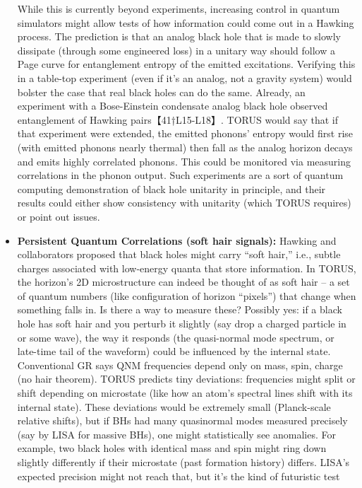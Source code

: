 \documentclass[]{article}
\begin{document}
\begin{itemize}
  While this is currently beyond experiments, increasing control in
  quantum simulators might allow tests of how information could come out
  in a Hawking process. The prediction is that an analog black hole that
  is made to slowly dissipate (through some engineered loss) in a
  unitary way should follow a Page curve for entanglement entropy of the
  emitted excitations. Verifying this in a table-top experiment (even if
  it's an analog, not a gravity system) would bolster the case that real
  black holes can do the same. Already, an experiment with a
  Bose-Einstein condensate analog black hole observed entanglement of
  Hawking pairs【41†L15-L18】. TORUS would say that if that experiment
  were extended, the emitted phonons' entropy would first rise (with
  emitted phonons nearly thermal) then fall as the analog horizon decays
  and emits highly correlated phonons. This could be monitored via
  measuring correlations in the phonon output. Such experiments are a
  sort of quantum computing demonstration of black hole unitarity in
  principle, and their results could either show consistency with
  unitarity (which TORUS requires) or point out issues.
\item
  \textbf{Persistent Quantum Correlations (soft hair signals):} Hawking
  and collaborators proposed that black holes might carry ``soft hair,''
  i.e., subtle charges associated with low-energy quanta that store
  information. In TORUS, the horizon's 2D microstructure can indeed be
  thought of as soft hair -- a set of quantum numbers (like
  configuration of horizon ``pixels'') that change when something falls
  in. Is there a way to measure these? Possibly yes: if a black hole has
  soft hair and you perturb it slightly (say drop a charged particle in
  or some wave), the way it responds (the quasi-normal mode spectrum, or
  late-time tail of the waveform) could be influenced by the internal
  state. Conventional GR says QNM frequencies depend only on mass, spin,
  charge (no hair theorem). TORUS predicts tiny deviations: frequencies
  might split or shift depending on microstate (like how an atom's
  spectral lines shift with its internal state). These deviations would
  be extremely small (Planck-scale relative shifts), but if BHs had many
  quasinormal modes measured precisely (say by LISA for massive BHs),
  one might statistically see anomalies. For example, two black holes
  with identical mass and spin might ring down slightly differently if
  their microstate (past formation history) differs. LISA's expected
  precision might not reach that, but it's the kind of futuristic test

\end{itemize}
\end{document}

